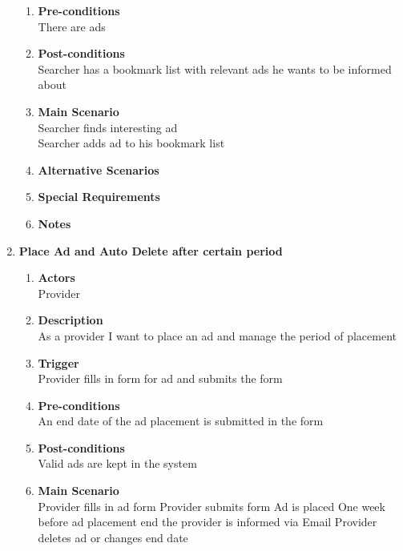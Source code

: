 \documentclass{scrreprt}
\begin{document}
\begin{enumerate}
\begin{enumerate}
		\item \textbf{Pre-conditions} \\
			There are ads

		\item \textbf{Post-conditions} \\
			Searcher has a bookmark list with relevant ads he wants to be informed about\\

		\item \textbf{Main Scenario} \\
			Searcher finds interesting ad\\
			Searcher adds ad to his bookmark list\\

		\item \textbf{Alternative Scenarios} \\

		\item \textbf{Special Requirements} \\

		\item \textbf{Notes} \\
	\end{enumerate}


	\item \textbf{Place Ad and Auto Delete after certain period}
	\begin{enumerate}
		\item \textbf{Actors}  \\
			Provider

		\item \textbf{Description} \\
			As a provider I want to place an ad and manage the period of placement
			
		\item \textbf{Trigger} \\
			Provider fills in form for ad and submits the form

		\item \textbf{Pre-conditions} \\
			An end date of the ad placement is submitted in the form

		\item \textbf{Post-conditions} \\
			Valid ads are kept in the system

		\item \textbf{Main Scenario} \\
			Provider fills in ad form
			Provider submits form
			Ad is placed
			One week before ad placement end the provider is informed via Email
			Provider deletes ad or changes end date


\end{enumerate}
\end{enumerate}
\end{document}

